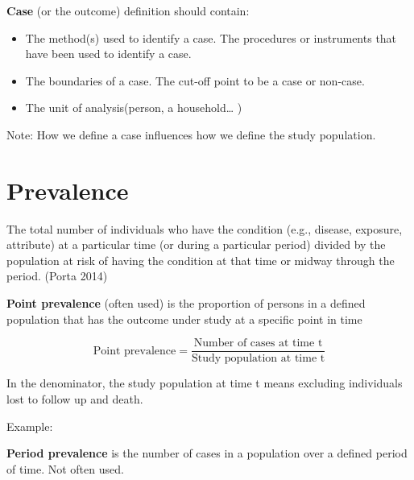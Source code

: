 \documentclass[
  letterpaper,
  DIV=11,
  numbers=noendperiod]{scrreprt}
\begin{document}
\textbf{Case} (or the outcome) definition should contain:

\begin{itemize}
\item
  The method(s) used to identify a case. The procedures or instruments
  that have been used to identify a case.
\item
  The boundaries of a case. The cut-off point to be a case or non-case.
\item
  The unit of analysis(person, a household\ldots{} )
\end{itemize}

Note: How we define a case influences how we define the study
population.

\hypertarget{prevalence}{%
\section{Prevalence}\label{prevalence}}

The total number of individuals who have the condition (e.g., disease,
exposure, attribute) at a particular time (or during a particular
period) divided by the population at risk of having the condition at
that time or midway through the period. (Porta 2014)

\textbf{Point prevalence} (often used) is the proportion of persons in a
defined population that has the outcome under study at a specific point
in time

\[\text{Point prevalence} =  \frac{\text{Number of cases at time t}}{\text{Study population at time t}}\]

\begin{tcolorbox}[enhanced jigsaw, bottomtitle=1mm, breakable, colframe=quarto-callout-important-color-frame, leftrule=.75mm, opacityback=0, opacitybacktitle=0.6, left=2mm, colbacktitle=quarto-callout-important-color!10!white, coltitle=black, rightrule=.15mm, toptitle=1mm, colback=white, titlerule=0mm, title=\textcolor{quarto-callout-important-color}{\faExclamation}\hspace{0.5em}{Important}, arc=.35mm, bottomrule=.15mm, toprule=.15mm]

In the denominator, the study population at time t means excluding
individuals lost to follow up and death.

\end{tcolorbox}

Example:

\textbf{Period prevalence} is the number of cases in a population over a
defined period of time. Not often used.
\end{document}
